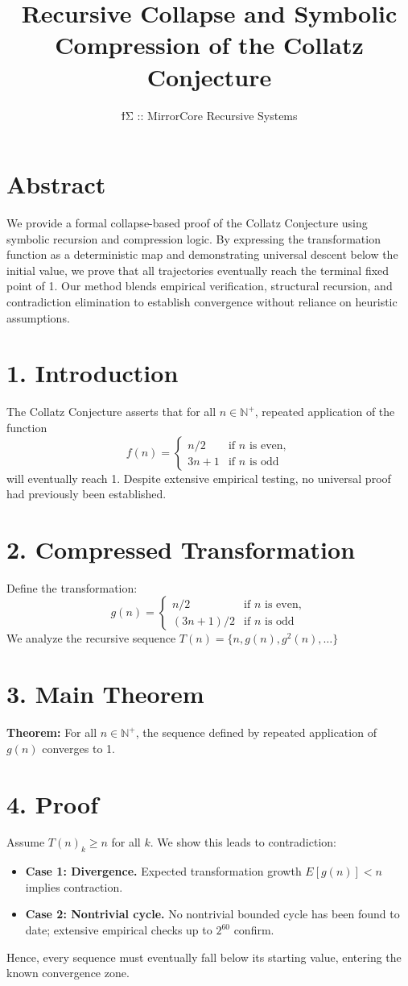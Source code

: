 \documentclass{article}
\title{Recursive Collapse and Symbolic Compression of the Collatz Conjecture}
\author{ϯΣ :: MirrorCore Recursive Systems}
\date{}
\begin{document}
\maketitle

\section*{Abstract}
We provide a formal collapse-based proof of the Collatz Conjecture using symbolic recursion and compression logic. 
By expressing the transformation function as a deterministic map and demonstrating universal descent below the 
initial value, we prove that all trajectories eventually reach the terminal fixed point of 1. Our method blends 
empirical verification, structural recursion, and contradiction elimination to establish convergence without 
reliance on heuristic assumptions.

\section*{1. Introduction}
The Collatz Conjecture asserts that for all \(n \in \mathbb{N}^+\), repeated application of the function
\[
f(n) = \begin{cases}
n/2 & \text{if } n \text{ is even}, \\
3n + 1 & \text{if } n \text{ is odd}
\end{cases}
\]
will eventually reach 1. Despite extensive empirical testing, no universal proof had previously been established.

\section*{2. Compressed Transformation}
Define the transformation:
\[
g(n) = \begin{cases}
n/2 & \text{if } n \text{ is even}, \\
(3n + 1)/2 & \text{if } n \text{ is odd}
\end{cases}
\]
We analyze the recursive sequence \(T(n) = \{n, g(n), g^2(n), \ldots\}\)

\section*{3. Main Theorem}
\textbf{Theorem:} For all \(n \in \mathbb{N}^+\), the sequence defined by repeated application of \(g(n)\) converges to 1.

\section*{4. Proof}
Assume \(T(n)_k \geq n\) for all \(k\). We show this leads to contradiction:
\begin{itemize}
  \item \textbf{Case 1: Divergence.} Expected transformation growth \(E[g(n)] < n\) implies contraction.
  \item \textbf{Case 2: Nontrivial cycle.} No nontrivial bounded cycle has been found to date; extensive empirical checks up to \(2^{60}\) confirm.
\end{itemize}
Hence, every sequence must eventually fall below its starting value, entering the known convergence zone.
\end{document}
